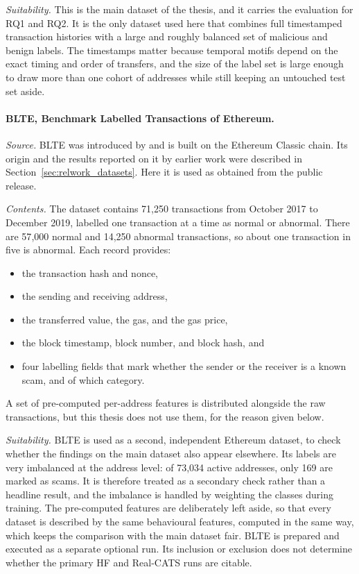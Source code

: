 \documentclass{thesisclass}
\begin{document}
\textit{Suitability.} This is the main dataset of the thesis, and it carries the
evaluation for RQ1 and RQ2. It is the only dataset used here that
combines full timestamped transaction histories with a large and roughly
balanced set of malicious and benign labels. The timestamps matter because
temporal motifs depend on the exact timing and order of transfers, and the size
of the label set is large enough to draw more than one cohort of addresses while
still keeping an untouched test set aside.

\paragraph{BLTE, Benchmark Labelled Transactions of Ethereum.}
\label{sec:dataset_blte}
\textit{Source.} BLTE was introduced by \citet{alemari2021labeled} and is built
on the Ethereum Classic chain. Its origin and the results reported on it by
earlier work were described in Section~\ref{sec:relwork_datasets}. Here it is
used as obtained from the public release.

\textit{Contents.} The dataset contains 71{,}250 transactions from October 2017
to December 2019, labelled one transaction at a time as normal or abnormal.
There are 57{,}000 normal and 14{,}250 abnormal transactions, so about one
transaction in five is abnormal. Each record provides:
\begin{itemize}
  \item the transaction hash and nonce,
  \item the sending and receiving address,
  \item the transferred value, the gas, and the gas price,
  \item the block timestamp, block number, and block hash, and
  \item four labelling fields that mark whether the sender or the receiver is a
        known scam, and of which category.
\end{itemize}
A set of pre-computed per-address features is distributed alongside the raw
transactions, but this thesis does not use them, for the reason given below.

\textit{Suitability.} BLTE is used as a second, independent Ethereum dataset, to
check whether the findings on the main dataset also appear elsewhere. Its labels
are very imbalanced at the address level: of 73{,}034 active addresses, only 169
are marked as scams. It is therefore treated as a secondary check rather than a
headline result, and the imbalance is handled by weighting the classes during
training. The pre-computed features are deliberately left aside, so that every
dataset is described by the same behavioural features, computed in the same way,
which keeps the comparison with the main dataset fair.
BLTE is prepared and executed as a separate optional run. Its inclusion or
exclusion does not determine whether the primary HF and Real-CATS runs are
citable.
\end{document}
